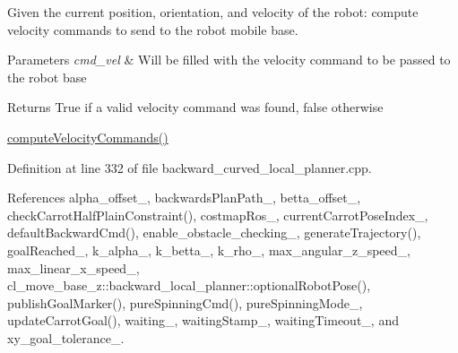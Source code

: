 Given the current position, orientation, and velocity of the robot\+: compute velocity commands to send to the robot mobile base. 


\begin{DoxyParams}{Parameters}
{\em cmd\+\_\+vel} & Will be filled with the velocity command to be passed to the robot base \\
\hline
\end{DoxyParams}
\begin{DoxyReturn}{Returns}
True if a valid velocity command was found, false otherwise
\end{DoxyReturn}
\hyperlink{classcl__move__base__z_1_1backward__local__planner_1_1BackwardLocalPlanner_a25437208766366ca22f967fe72e80988}{compute\+Velocity\+Commands()} 

Definition at line 332 of file backward\+\_\+curved\+\_\+local\+\_\+planner.\+cpp.



References alpha\+\_\+offset\+\_\+, backwards\+Plan\+Path\+\_\+, betta\+\_\+offset\+\_\+, check\+Carrot\+Half\+Plain\+Constraint(), costmap\+Ros\+\_\+, current\+Carrot\+Pose\+Index\+\_\+, default\+Backward\+Cmd(), enable\+\_\+obstacle\+\_\+checking\+\_\+, generate\+Trajectory(), goal\+Reached\+\_\+, k\+\_\+alpha\+\_\+, k\+\_\+betta\+\_\+, k\+\_\+rho\+\_\+, max\+\_\+angular\+\_\+z\+\_\+speed\+\_\+, max\+\_\+linear\+\_\+x\+\_\+speed\+\_\+, cl\+\_\+move\+\_\+base\+\_\+z\+::backward\+\_\+local\+\_\+planner\+::optional\+Robot\+Pose(), publish\+Goal\+Marker(), pure\+Spinning\+Cmd(), pure\+Spinning\+Mode\+\_\+, update\+Carrot\+Goal(), waiting\+\_\+, waiting\+Stamp\+\_\+, waiting\+Timeout\+\_\+, and xy\+\_\+goal\+\_\+tolerance\+\_\+.


